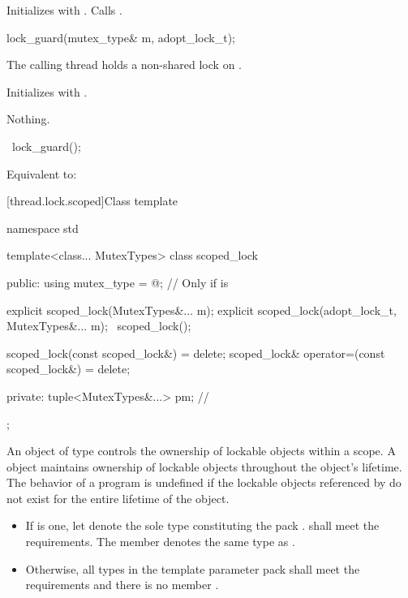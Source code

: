 \begin{itemdescr}
\pnum
\effects
Initializes  with . Calls .
\end{itemdescr}

%
\begin{itemdecl}
lock_guard(mutex_type& m, adopt_lock_t);
\end{itemdecl}

\begin{itemdescr}
\pnum
\expects
The calling thread holds a non-shared lock on .

\pnum
\effects
Initializes  with .

\pnum
\throws
Nothing.
\end{itemdescr}

%
\begin{itemdecl}
~lock_guard();
\end{itemdecl}

\begin{itemdescr}
\pnum
\effects
Equivalent to: 
\end{itemdescr}

[thread.lock.scoped]{Class template }

%
\begin{codeblock}
namespace std {
  template<class... MutexTypes>
  class scoped_lock {
  public:
    using mutex_type = @\seebelow@;     // Only if  is 

    explicit scoped_lock(MutexTypes&... m);
    explicit scoped_lock(adopt_lock_t, MutexTypes&... m);
    ~scoped_lock();

    scoped_lock(const scoped_lock&) = delete;
    scoped_lock& operator=(const scoped_lock&) = delete;

  private:
    tuple<MutexTypes&...> pm;   // \expos
  };
}
\end{codeblock}

\pnum
An object of type  controls the ownership of lockable objects
within a scope. A  object maintains ownership of lockable
objects throughout the  object's lifetime.
The behavior of a program is undefined if the lockable objects referenced by
 do not exist for the entire lifetime of the 
object.
\begin{itemize}
\item
If  is one,
let  denote the sole type constituting the pack .
shall meet the  requirements.
The member  
denotes the same type as .
\item
Otherwise, all types in the template parameter pack 
shall meet the  requirements
and there is no member .
\end{itemize}

